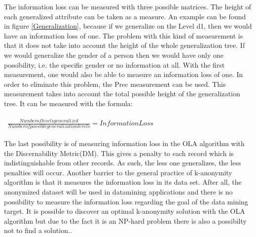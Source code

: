 \documentclass{llncs}
\begin{document}
The information loss can be measured with three possible matrices. The height of each generalized attribute can be taken as a measure. An example can be found in figure  \ref{Generalization}, because if we generalize on the Level d1, then we would have an information loss of one. The problem with this kind of measurement is that it does not take into account the height of the whole generalization tree. If we would generalize the gender of a person then we would have only one possibility, i.e. the specific gender or no information at all. With the first measurement, one would also be able to measure an information loss of one. In order to eliminate this problem, the Prec measurement can be used. This measurement takes into account the total possible height of the generalization tree. It can be measured with the formula:\\\\ \ $\frac{Number of levels generalized}{Number of possible generalization levels} = Information Loss$\\\\The last possibility is of measuring information loss in the OLA algorithm with the Discernability Metric(DM). This gives a penalty to each record which is indistinguishable from other records. As such, the less one generalizes, the less penalties will occur. Another barrier to the general practice of k-anonymity algorithm is that it measures the information loss in its data set. After all, the anonymized dataset will be used in datamining applications and there is no possibility to measure the information loss regarding the goal of the data mining target. It is possible to discover an optimal k-anonymity solution with the OLA algorithm but due to the fact it is an NP-hard problem there is also a possibilty not to find a solution.\cite{el2009globally}.
\end{document}
